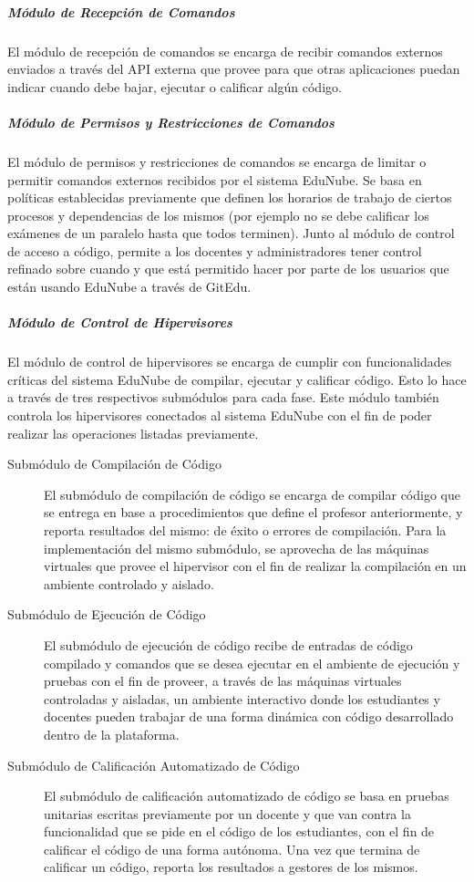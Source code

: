 \subparagraph{Módulo de Recepción de Comandos}
 
El módulo de recepción de comandos se encarga de recibir comandos externos enviados a través del API externa que provee para que otras aplicaciones puedan indicar cuando debe bajar, ejecutar o calificar algún código.

\subparagraph{Módulo de Permisos y Restricciones de Comandos}
 
El módulo de permisos y restricciones de comandos se encarga de limitar o permitir comandos externos recibidos por el sistema EduNube. Se basa en políticas establecidas previamente que definen los horarios de trabajo de ciertos procesos y dependencias de los mismos (por ejemplo no se debe calificar los exámenes de un paralelo hasta que todos terminen). Junto al módulo de control de acceso a código, permite a los docentes y administradores tener control refinado sobre cuando y que está permitido hacer por parte de los usuarios que están usando EduNube a través de GitEdu.

\subparagraph{Módulo de Control de Hipervisores}
 
El módulo de control de hipervisores se encarga de cumplir con funcionalidades críticas del sistema EduNube de compilar, ejecutar y calificar código. Esto lo hace a través de tres respectivos submódulos para cada fase. Este módulo también controla los hipervisores conectados al sistema EduNube con el fin de poder realizar las operaciones listadas previamente.
\begin{description}
	\item[Submódulo de Compilación de Código] 
	El submódulo de compilación de código se encarga de compilar código que se entrega en base a procedimientos que define el profesor anteriormente, y reporta resultados del mismo: de éxito o errores de compilación. Para la implementación del mismo submódulo, se aprovecha de las máquinas virtuales que provee el hipervisor con el fin de realizar la compilación en un ambiente controlado y aislado.
    \item[Submódulo de Ejecución de Código] 
	El submódulo de ejecución de código recibe de entradas de código compilado y comandos que se desea ejecutar en el ambiente de ejecución y pruebas con el fin de proveer, a través de las máquinas virtuales controladas y aisladas, un ambiente interactivo donde los estudiantes y docentes pueden trabajar de una forma dinámica con código desarrollado dentro de la plataforma.
    \item[Submódulo de Calificación Automatizado de Código] 
	El submódulo de calificación automatizado de código se basa en pruebas unitarias escritas previamente por un docente y que van contra la funcionalidad que se pide en el código de los estudiantes, con el fin de calificar el código de una forma autónoma. Una vez que termina de calificar un código, reporta los resultados a gestores de los mismos.
\end{description}


